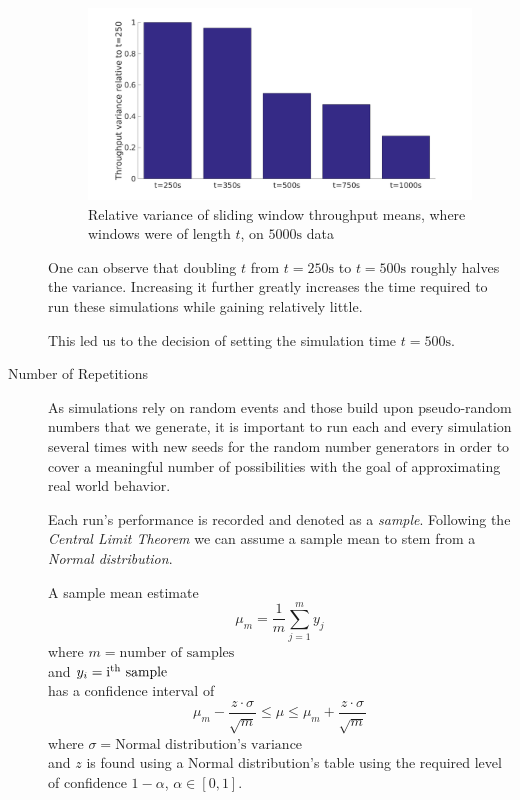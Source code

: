\documentclass[a4paper]{scrreprt}
\begin{document}
\begin{description}
			\begin{figure}[H]
				\center\includegraphics[width=\textwidth]{../Get_Simulation_Parameters/relative_variance.png}
				\caption{Relative variance of sliding window throughput means, where windows were of length $t$, on $5000\text{s}$ data}
				\label{fig:relativevariance}
			\end{figure}
			
			One can observe that doubling $t$ from $t=250\text{s}$ to $t=500\text{s}$ roughly halves the variance. Increasing it further greatly increases the time required to run these simulations while gaining relatively little.
			
			This led us to the decision of setting the simulation time $t=500\text{s}$.
			
			\item[Number of Repetitions] As simulations rely on random events and those build upon pseudo-random numbers that we generate, it is important to run each and every simulation several times with new seeds for the random number generators in order to cover a meaningful number of possibilities with the goal of approximating real world behavior. 
			
			Each run's performance is recorded and denoted as a \emph{sample}. Following the \emph{Central Limit Theorem} we can assume a sample mean to stem from a \emph{Normal distribution}. 
			
			A sample mean estimate
			\[\mu_m=\frac{1}{m}\sum^m_{j=1}y_j\]
			where $m=\text{number of samples}$
			\\and $y_i=\text{i\textsuperscript{th} sample}$
			\\has a confidence interval of
			\[\mu_m-\frac{z\cdot \sigma}{\sqrt{m}}\leq \mu \leq \mu_m+\frac{z\cdot \sigma}{\sqrt{m}}\]
			where $\sigma=\text{Normal distribution's variance}$
			\\and $z$ is found using a Normal distribution's table using the required level of confidence $1-\alpha$, $\alpha\in [0,1]$.
			

\end{description}
\end{document}
